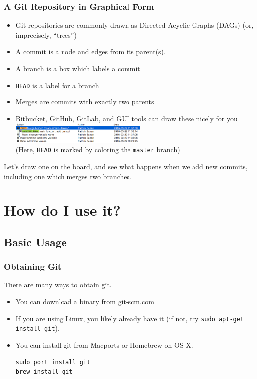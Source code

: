 \documentclass{beamer}
\begin{document}
\begin{frame}[fragile]
\frametitle{A Git Repository in Graphical Form}
\begin{itemize}
\item Git repositories are commonly drawn as Directed Acyclic Graphs (DAGs) (or, imprecisely, ``trees'')
\item A commit is a node and edges from its parent(s).
\item A branch is a box which labels a commit
\item \texttt{HEAD} is a label for a branch
\item Merges are commits with exactly two parents
\item Bitbucket, GitHub, GitLab, and GUI tools can draw these nicely for you
\includegraphics[width=250px]{gitx.png}\\
(Here, \texttt{HEAD} is marked by coloring the \texttt{master} branch)
\end{itemize}
Let's draw one on the board, and see what happens when we add new commits, including one which merges two branches.
\end{frame}

\section{How do I use it?}

\subsection{Basic Usage}
\begin{frame}[fragile]
\frametitle{Obtaining Git}
There are many ways to obtain git.
\begin{itemize}
  \item You can download a binary from \href{http://git-scm.com}{git-scm.com}
\item If you are using Linux, you likely already have it (if not, try \lstinline{sudo apt-get install git}).
\item You can install git from Macports or Homebrew on OS X.
\begin{lstlisting}
sudo port install git
brew install git
\end{lstlisting}

\end{itemize}
\end{frame}
\end{document}
